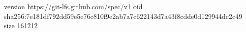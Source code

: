 version https://git-lfs.github.com/spec/v1
oid sha256:7e181df792dd59e5e76c810f9e2ab7a7c622143d7a43f8cdde0d129944dc2c49
size 161212
